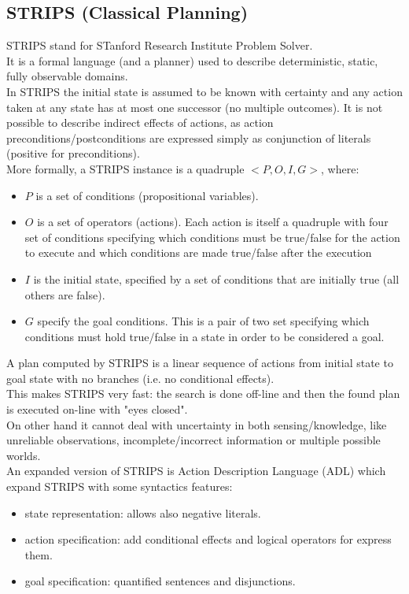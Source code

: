 \documentclass[pdftex,12pt,a4paper]{report}
\begin{document}
\subsection{STRIPS (Classical Planning)}
\noindent STRIPS \cite{fikes1971strips} stand for STanford Research Institute Problem Solver. %
\\\noindent It is a formal language (and a planner) used to describe deterministic, static, fully observable domains. 
\\\noindent In STRIPS the initial state is assumed to be known with certainty and any action taken at any state has at most one successor (no multiple outcomes). It is not possible to describe indirect effects of actions, as action preconditions/postconditions are expressed simply as conjunction of literals (positive for preconditions).
\\\noindent More formally, a STRIPS instance is a quadruple $<P,O,I,G>$, where:
\begin{itemize}
\item $P$ is a set of conditions (propositional variables).
\item $O$ is a set of operators (actions). Each action is itself a quadruple with four set of conditions specifying which conditions must be true/false for the action to execute and which conditions are made true/false after the execution
\item $I$ is the initial state, specified by a set of conditions that are initially true (all others are false).
\item $G$ specify the goal conditions. This is a pair of two set specifying which conditions must hold true/false in a state in order to be considered a goal.
\end{itemize}
\noindent A plan computed by STRIPS is a linear sequence of actions from initial state to goal state with no branches (i.e. no conditional effects).
\\\noindent This makes STRIPS very fast: the search is done off-line and then the found plan is executed on-line with "eyes closed". 
\\\noindent On other hand it cannot deal with uncertainty in both sensing/knowledge, like unreliable observations, incomplete/incorrect information or multiple possible worlds.  
\\\noindent An expanded version of STRIPS is Action Description Language (ADL)\cite{pednault1987formulating}%
which expand STRIPS with some syntactics features:
\begin{itemize}
\item state representation: allows also negative literals.
\item action specification: add conditional effects and logical operators for express them.
\item goal specification: quantified sentences and disjunctions.
\end{itemize}
\end{document}
